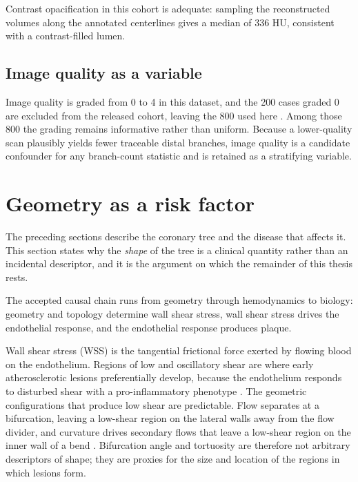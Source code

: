 Contrast opacification in this cohort is adequate: sampling the reconstructed volumes along
the annotated centerlines gives a median of 336 HU, consistent with a contrast-filled lumen.

\subsection{Image quality as a variable}

Image quality is graded from 0 to 4 in this dataset, and the 200 cases graded 0 are excluded
from the released cohort, leaving the 800 used here \cite{bransby2026imagecasx}.
Among those 800 the grading remains informative rather than uniform.
Because a lower-quality scan plausibly yields fewer traceable distal branches, image quality
is a candidate confounder for any branch-count statistic and is retained as a stratifying
variable.

\section{Geometry as a risk factor}
\label{sec:geometry}

The preceding sections describe the coronary tree and the disease that affects it.
This section states why the \emph{shape} of the tree is a clinical quantity rather than an
incidental descriptor, and it is the argument on which the remainder of this thesis rests.

The accepted causal chain runs from geometry through hemodynamics to biology: geometry and
topology determine wall shear stress, wall shear stress drives the endothelial response, and
the endothelial response produces plaque.

Wall shear stress (WSS) is the tangential frictional force exerted by flowing blood on the
endothelium.
Regions of low and oscillatory shear are where early atherosclerotic lesions preferentially
develop, because the endothelium responds to disturbed shear with a pro-inflammatory
phenotype \cite{geometry2022plaqueburden}.
The geometric configurations that produce low shear are predictable.
Flow separates at a bifurcation, leaving a low-shear region on the lateral walls away from
the flow divider, and curvature drives secondary flows that leave a low-shear region on the
inner wall of a bend \cite{geometry2022plaqueburden}.
Bifurcation angle and tortuosity are therefore not arbitrary descriptors of shape; they are
proxies for the size and location of the regions in which lesions form.

